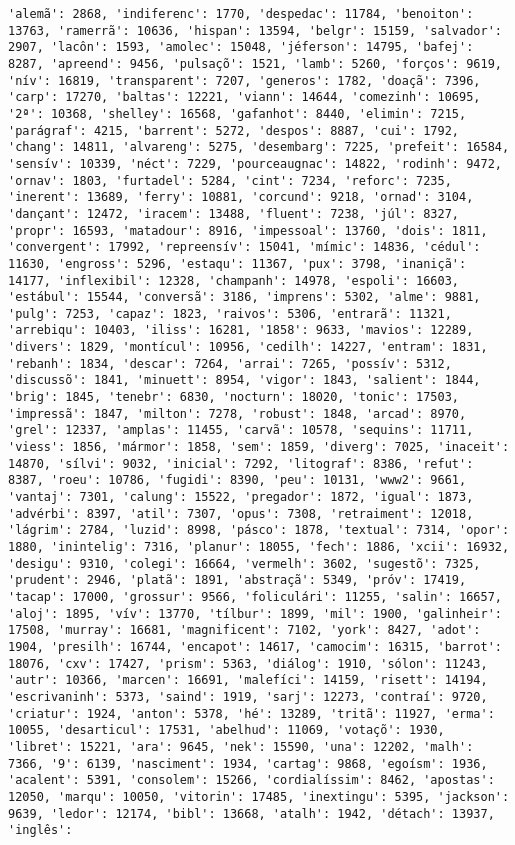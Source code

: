 \documentclass[11pt]{article}
\begin{document}
\begin{Verbatim}[commandchars=\\\{\}]
'alemã': 2868, 'indiferenc': 1770, 'despedac': 11784, 'benoiton': 13763, 'ramerrã': 10636, 'hispan': 13594, 'belgr': 15159, 'salvador': 2907, 'lacôn': 1593, 'amolec': 15048, 'jéferson': 14795, 'bafej': 8287, 'apreend': 9456, 'pulsaçõ': 1521, 'lamb': 5260, 'forços': 9619, 'nív': 16819, 'transparent': 7207, 'generos': 1782, 'doaçã': 7396, 'carp': 17270, 'baltas': 12221, 'viann': 14644, 'comezinh': 10695, '2ª': 10368, 'shelley': 16568, 'gafanhot': 8440, 'elimin': 7215, 'parágraf': 4215, 'barrent': 5272, 'despos': 8887, 'cui': 1792, 'chang': 14811, 'alvareng': 5275, 'desembarg': 7225, 'prefeit': 16584, 'sensív': 10339, 'néct': 7229, 'pourceaugnac': 14822, 'rodinh': 9472, 'ornav': 1803, 'furtadel': 5284, 'cint': 7234, 'reforc': 7235, 'inerent': 13689, 'ferry': 10881, 'corcund': 9218, 'ornad': 3104, 'dançant': 12472, 'iracem': 13488, 'fluent': 7238, 'júl': 8327, 'propr': 16593, 'matadour': 8916, 'impessoal': 13760, 'dois': 1811, 'convergent': 17992, 'repreensív': 15041, 'mímic': 14836, 'cédul': 11630, 'engross': 5296, 'estaqu': 11367, 'pux': 3798, 'inaniçã': 14177, 'inflexibil': 12328, 'champanh': 14978, 'espoli': 16603, 'estábul': 15544, 'conversã': 3186, 'imprens': 5302, 'alme': 9881, 'pulg': 7253, 'capaz': 1823, 'raivos': 5306, 'entrarã': 11321, 'arrebiqu': 10403, 'iliss': 16281, '1858': 9633, 'mavios': 12289, 'divers': 1829, 'montícul': 10956, 'cedilh': 14227, 'entram': 1831, 'rebanh': 1834, 'descar': 7264, 'arrai': 7265, 'possív': 5312, 'discussõ': 1841, 'minuett': 8954, 'vigor': 1843, 'salient': 1844, 'brig': 1845, 'tenebr': 6830, 'nocturn': 18020, 'tonic': 17503, 'impressã': 1847, 'milton': 7278, 'robust': 1848, 'arcad': 8970, 'grel': 12337, 'amplas': 11455, 'carvã': 10578, 'sequins': 11711, 'viess': 1856, 'mármor': 1858, 'sem': 1859, 'diverg': 7025, 'inaceit': 14870, 'sílvi': 9032, 'inicial': 7292, 'litograf': 8386, 'refut': 8387, 'roeu': 10786, 'fugidi': 8390, 'peu': 10131, 'www2': 9661, 'vantaj': 7301, 'calung': 15522, 'pregador': 1872, 'igual': 1873, 'advérbi': 8397, 'atil': 7307, 'opus': 7308, 'retraiment': 12018, 'lágrim': 2784, 'luzid': 8998, 'pásco': 1878, 'textual': 7314, 'opor': 1880, 'inintelig': 7316, 'planur': 18055, 'fech': 1886, 'xcii': 16932, 'desigu': 9310, 'colegi': 16664, 'vermelh': 3602, 'sugestõ': 7325, 'prudent': 2946, 'platã': 1891, 'abstraçã': 5349, 'próv': 17419, 'tacap': 17000, 'grossur': 9566, 'foliculári': 11255, 'salin': 16657, 'aloj': 1895, 'vív': 13770, 'tílbur': 1899, 'mil': 1900, 'galinheir': 17508, 'murray': 16681, 'magnificent': 7102, 'york': 8427, 'adot': 1904, 'presilh': 16744, 'encapot': 14617, 'camocim': 16315, 'barrot': 18076, 'cxv': 17427, 'prism': 5363, 'diálog': 1910, 'sólon': 11243, 'autr': 10366, 'marcen': 16691, 'malefíci': 14159, 'risett': 14194, 'escrivaninh': 5373, 'saind': 1919, 'sarj': 12273, 'contraí': 9720, 'criatur': 1924, 'anton': 5378, 'hé': 13289, 'tritã': 11927, 'erma': 10055, 'desarticul': 17531, 'abelhud': 11069, 'votaçõ': 1930, 'libret': 15221, 'ara': 9645, 'nek': 15590, 'una': 12202, 'malh': 7366, '9': 6139, 'nasciment': 1934, 'cartag': 9868, 'egoísm': 1936, 'acalent': 5391, 'consolem': 15266, 'cordialíssim': 8462, 'apostas': 12050, 'marqu': 10050, 'vitorin': 17485, 'inextingu': 5395, 'jackson': 9639, 'ledor': 12174, 'bibl': 13668, 'atalh': 1942, 'détach': 13937, 'inglês': 
\end{Verbatim}
\end{document}
